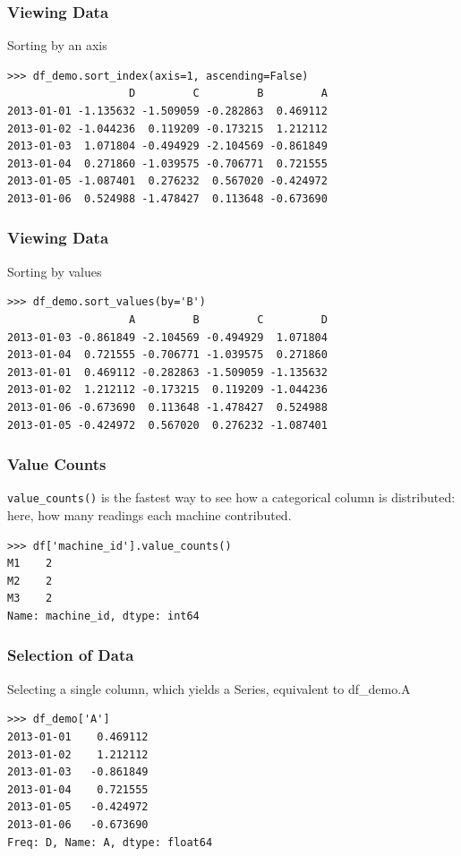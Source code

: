 \begin{frame}[fragile]\frametitle{Viewing Data}
Sorting by an axis
\begin{lstlisting}
>>> df_demo.sort_index(axis=1, ascending=False)
                   D         C         B         A
2013-01-01 -1.135632 -1.509059 -0.282863  0.469112
2013-01-02 -1.044236  0.119209 -0.173215  1.212112
2013-01-03  1.071804 -0.494929 -2.104569 -0.861849
2013-01-04  0.271860 -1.039575 -0.706771  0.721555
2013-01-05 -1.087401  0.276232  0.567020 -0.424972
2013-01-06  0.524988 -1.478427  0.113648 -0.673690
\end{lstlisting}
\end{frame}

\begin{frame}[fragile]\frametitle{Viewing Data}
Sorting by values
\begin{lstlisting}
>>> df_demo.sort_values(by='B')
                   A         B         C         D
2013-01-03 -0.861849 -2.104569 -0.494929  1.071804
2013-01-04  0.721555 -0.706771 -1.039575  0.271860
2013-01-01  0.469112 -0.282863 -1.509059 -1.135632
2013-01-02  1.212112 -0.173215  0.119209 -1.044236
2013-01-06 -0.673690  0.113648 -1.478427  0.524988
2013-01-05 -0.424972  0.567020  0.276232 -1.087401
\end{lstlisting}
\end{frame}

\begin{frame}[fragile]\frametitle{Value Counts}
\texttt{value\_counts()} is the fastest way to see how a categorical column is distributed: here, how many readings each machine contributed.
\begin{lstlisting}
>>> df['machine_id'].value_counts()
M1    2
M2    2
M3    2
Name: machine_id, dtype: int64
\end{lstlisting}
\end{frame}

\begin{frame}[fragile]\frametitle{Selection of Data}
Selecting a single column, which yields a Series, equivalent to df\_demo.A
\begin{lstlisting}
>>> df_demo['A']
2013-01-01    0.469112
2013-01-02    1.212112
2013-01-03   -0.861849
2013-01-04    0.721555
2013-01-05   -0.424972
2013-01-06   -0.673690
Freq: D, Name: A, dtype: float64
\end{lstlisting}
\end{frame}

